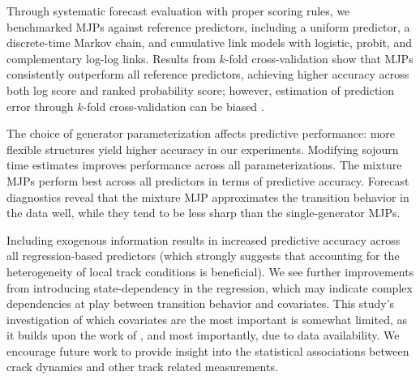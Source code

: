 Through systematic forecast evaluation with proper scoring rules, we benchmarked MJPs against reference predictors, including a uniform predictor, a discrete-time Markov chain, and cumulative link models with logistic, probit, and complementary log-log links. Results from $k$-fold cross-validation show that MJPs consistently outperform all reference predictors, achieving higher accuracy across both log score and ranked probability score; however, estimation of prediction error through $k$-fold cross-validation can be biased \citep{fushiki2011a}.

The choice of generator parameterization affects predictive performance: more flexible structures yield higher accuracy in our experiments. Modifying sojourn time estimates improves performance across all parameterizations. 
The mixture MJPs perform best across all predictors in terms of predictive accuracy. Forecast diagnostics reveal that the mixture MJP approximates the transition behavior in the data well, while they tend to be less sharp than the single-generator MJPs.

Including exogenous information results in increased predictive accuracy across all regression-based predictors (which strongly suggests that accounting for the heterogeneity of local track conditions is beneficial). We see further improvements from introducing state-dependency in the regression, which may indicate complex dependencies at play between transition behavior and covariates. This study's investigation of which covariates are the most important is somewhat limited, as it builds upon the work of \citet{bisgaard2024A}, and most importantly, due to data availability. We encourage future work to provide insight into the statistical associations between crack dynamics and other track related measurements.

